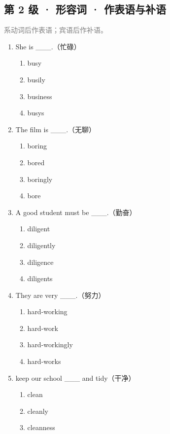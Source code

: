 \documentclass[11pt,a4paper]{ctexart}
\begin{document}
\subsection*{第 2 级 · 形容词 · 作表语与补语}
\noindent\textcolor{gray}{系动词后作表语；宾语后作补语。}\par\smallskip
\begin{enumerate}[leftmargin=*,itemsep=4pt]
\item She is \_\_\_.（忙碌）
\begin{enumerate}[label=\Alph*.,leftmargin=2em,itemsep=1pt,topsep=2pt]
\item busy
\item busily
\item business
\item busys
\end{enumerate}
\item The film is \_\_\_.（无聊）
\begin{enumerate}[label=\Alph*.,leftmargin=2em,itemsep=1pt,topsep=2pt]
\item boring
\item bored
\item boringly
\item bore
\end{enumerate}
\item A good student must be \_\_\_.（勤奋）
\begin{enumerate}[label=\Alph*.,leftmargin=2em,itemsep=1pt,topsep=2pt]
\item diligent
\item diligently
\item diligence
\item diligents
\end{enumerate}
\item They are very \_\_\_.（努力）
\begin{enumerate}[label=\Alph*.,leftmargin=2em,itemsep=1pt,topsep=2pt]
\item hard-working
\item hard-work
\item hard-workingly
\item hard-works
\end{enumerate}
\item keep our school \_\_\_ and tidy（干净）
\begin{enumerate}[label=\Alph*.,leftmargin=2em,itemsep=1pt,topsep=2pt]
\item clean
\item cleanly
\item cleanness

\end{enumerate}
\end{enumerate}
\end{document}
